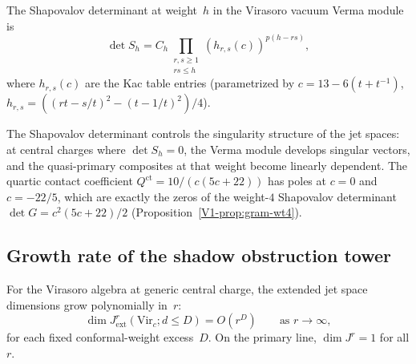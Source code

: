 \begin{remark}
The Shapovalov determinant at weight~$h$ in the Virasoro
vacuum Verma module is
\begin{equation}%
\det S_h = C_h \prod_{\substack{r,s \geq 1 \\ rs \leq h}}
(h_{r,s}(c))^{p(h-rs)},
\end{equation}
where $h_{r,s}(c)$ are the Kac table entries
(parametrized by
$c = 13 - 6(t + t^{-1})$, $h_{r,s} =
((rt - s/t)^2 - (t - 1/t)^2)/4$).

The Shapovalov determinant controls the singularity
structure of the jet spaces: at central charges where
$\det S_h = 0$, the Verma module develops singular
vectors, and the quasi-primary composites at that weight
become linearly dependent. The quartic contact
coefficient $Q^{\mathrm{ct}} = 10/(c(5c+22))$ has
poles at $c = 0$ and $c = -22/5$, which are exactly
the zeros of the weight-$4$ Shapovalov determinant
$\det G = c^2(5c+22)/2$
(Proposition~\ref{V1-prop:gram-wt4}).
\end{remark}


\subsection{Growth rate of the shadow obstruction tower}

\begin{theorem}
For the Virasoro algebra at generic central charge,
the extended jet space dimensions grow
polynomially in~$r$:
\begin{equation}%
\dim J^r_{\mathrm{ext}}(\mathrm{Vir}_c; d \leq D)
= O(r^D)
\qquad \text{as } r \to \infty,
\end{equation}
for each fixed conformal-weight excess~$D$.
On the primary line, $\dim J^r = 1$ for all $r$.
\end{theorem}

